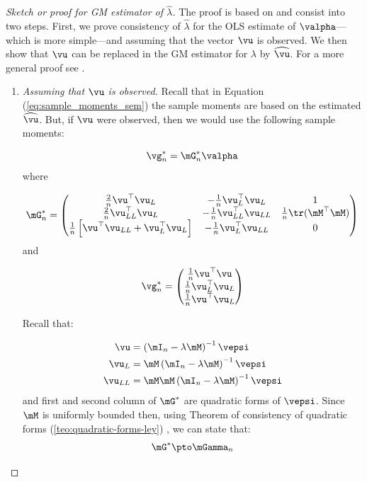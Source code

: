 \documentclass[english,12pt]{book}\usepackage[]{graphicx}\usepackage[]{xcolor}
\begin{document}
\begin{proof}[Sketch or proof for GM estimator of $\widehat{\lambda}$]
The proof is based on \cite{kelejian2017spatial}
 and consist into two steps. First, we prove consistency of $\widehat{\lambda}$ for the OLS estimate of $\valpha$---which is more simple---and assuming that the vector $\vu$ is observed. We then show that $\vu$ can be replaced in the GM estimator for $\lambda$ by $\widehat{\vu}$. For a more general proof see \citet{kelejian1998generalized, kelejian1999generalized}.

\begin{enumerate}
  \item \emph{Assuming that $\vu$ is observed.} Recall that in Equation (\ref{eq:sample_moments_sem}) the sample moments are based on the estimated $\widehat{\vu}$. But, if $\vu$ were observed, then we would use the following sample moments:
  
\begin{equation*}
  \vg_n^* = \mG_n^*\valpha
\end{equation*}
%
where 

\begin{equation*}
  \mG_n^* = \begin{pmatrix}
   \frac{2}{n}\vu^\top\vu_L & -\frac{1}{n}\vu_L^\top\vu_L & 1\\
   \frac{2}{n}\vu^\top_{LL}\vu_L & -\frac{1}{n}\vu_{LL}^\top\vu_{LL} & \frac{1}{n} \tr(\mM^\top\mM)\\
   \frac{1}{n}\left[\vu^\top\vu_{LL} + \vu_L^\top\vu_L\right] & -\frac{1}{n}\vu_{L}^\top\vu_{LL} & 0
        \end{pmatrix}
\end{equation*}
%
and

\begin{equation*}
  \vg_n^* = \begin{pmatrix}
  \frac{1}{n}\vu^\top\vu \\
  \frac{1}{n}\vu^\top_L\vu_L \\
  \frac{1}{n}\vu^\top\vu_L
        \end{pmatrix}
\end{equation*}

Recall that:

\begin{equation*}
  \begin{aligned}
    \vu & = \left(\mI_n - \lambda\mM\right)^{-1}\vepsi \\
    \vu_L & = \mM\left(\mI_n - \lambda\mM\right)^{-1}\vepsi \\
    \vu_{LL} & = \mM\mM\left(\mI_n - \lambda\mM\right)^{-1}\vepsi
  \end{aligned}
\end{equation*}
%
and first and second column of $\mG^*$ are quadratic forms of $\vepsi$. Since $\mM$ is uniformly bounded then, using Theorem of consistency of quadratic forms (\ref{teo:quadratic-forms-ley}) , we can state that:
\begin{equation*}
\mG^*\pto \mGamma_n
\end{equation*}


\end{enumerate}
\end{proof}
\end{document}
